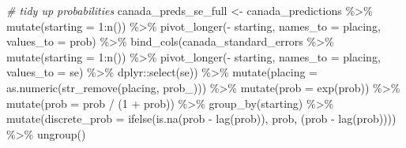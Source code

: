 \documentclass[
]{book}
\newenvironment{Shaded}{\begin{snugshade}}{\end{snugshade}}
\newcommand{\AttributeTok}[1]{\textcolor[rgb]{0.77,0.63,0.00}{#1}}
\newcommand{\CommentTok}[1]{\textcolor[rgb]{0.56,0.35,0.01}{\textit{#1}}}
\newcommand{\DecValTok}[1]{\textcolor[rgb]{0.00,0.00,0.81}{#1}}
\newcommand{\FunctionTok}[1]{\textcolor[rgb]{0.00,0.00,0.00}{#1}}
\newcommand{\NormalTok}[1]{#1}
\newcommand{\OtherTok}[1]{\textcolor[rgb]{0.56,0.35,0.01}{#1}}
\newcommand{\SpecialCharTok}[1]{\textcolor[rgb]{0.00,0.00,0.00}{#1}}
\newcommand{\StringTok}[1]{\textcolor[rgb]{0.31,0.60,0.02}{#1}}
\begin{document}
\begin{Shaded}
\begin{Highlighting}[]
\CommentTok{\# tidy up probabilities}
\NormalTok{canada\_preds\_se\_full }\OtherTok{\textless{}{-}}\NormalTok{ canada\_predictions }\SpecialCharTok{\%\textgreater{}\%}
  \FunctionTok{mutate}\NormalTok{(}\AttributeTok{starting =} \DecValTok{1}\SpecialCharTok{:}\FunctionTok{n}\NormalTok{()) }\SpecialCharTok{\%\textgreater{}\%}
  \FunctionTok{pivot\_longer}\NormalTok{(}\SpecialCharTok{{-}}\NormalTok{ starting, }\AttributeTok{names\_to =} \StringTok{\textquotesingle{}placing\textquotesingle{}}\NormalTok{, }\AttributeTok{values\_to =} \StringTok{\textquotesingle{}prob\textquotesingle{}}\NormalTok{) }\SpecialCharTok{\%\textgreater{}\%} 
  \FunctionTok{bind\_cols}\NormalTok{(canada\_standard\_errors }\SpecialCharTok{\%\textgreater{}\%} \FunctionTok{mutate}\NormalTok{(}\AttributeTok{starting =} \DecValTok{1}\SpecialCharTok{:}\FunctionTok{n}\NormalTok{()) }\SpecialCharTok{\%\textgreater{}\%}
  \FunctionTok{pivot\_longer}\NormalTok{(}\SpecialCharTok{{-}}\NormalTok{ starting, }\AttributeTok{names\_to =} \StringTok{\textquotesingle{}placing\textquotesingle{}}\NormalTok{, }\AttributeTok{values\_to =} \StringTok{\textquotesingle{}se\textquotesingle{}}\NormalTok{) }\SpecialCharTok{\%\textgreater{}\%}
\NormalTok{    dplyr}\SpecialCharTok{::}\FunctionTok{select}\NormalTok{(se)) }\SpecialCharTok{\%\textgreater{}\%}
  \FunctionTok{mutate}\NormalTok{(}\AttributeTok{placing =} \FunctionTok{as.numeric}\NormalTok{(}\FunctionTok{str\_remove}\NormalTok{(placing, }\StringTok{\textquotesingle{}prob\_\textquotesingle{}}\NormalTok{))) }\SpecialCharTok{\%\textgreater{}\%}
  \FunctionTok{mutate}\NormalTok{(}\AttributeTok{prob =} \FunctionTok{exp}\NormalTok{(prob)) }\SpecialCharTok{\%\textgreater{}\%}
  \FunctionTok{mutate}\NormalTok{(}\AttributeTok{prob =}\NormalTok{ prob }\SpecialCharTok{/}\NormalTok{ (}\DecValTok{1} \SpecialCharTok{+}\NormalTok{ prob)) }\SpecialCharTok{\%\textgreater{}\%}
  \FunctionTok{group\_by}\NormalTok{(starting) }\SpecialCharTok{\%\textgreater{}\%} 
  \FunctionTok{mutate}\NormalTok{(}\AttributeTok{discrete\_prob =} \FunctionTok{ifelse}\NormalTok{(}\FunctionTok{is.na}\NormalTok{(prob }\SpecialCharTok{{-}} \FunctionTok{lag}\NormalTok{(prob)), prob, (prob }\SpecialCharTok{{-}} \FunctionTok{lag}\NormalTok{(prob)))) }\SpecialCharTok{\%\textgreater{}\%}
  \FunctionTok{ungroup}\NormalTok{()}


\end{Highlighting}
\end{Shaded}
\end{document}
